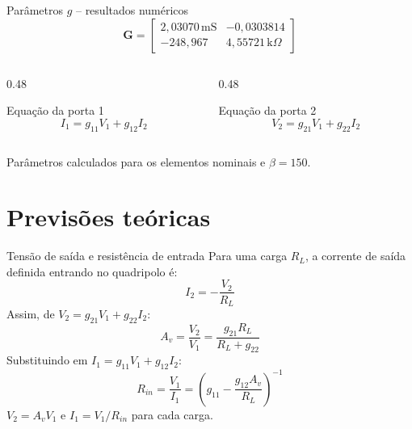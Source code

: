 \documentclass[aspectratio=169,11pt]{beamer}
\begin{document}
\begin{frame}{Parâmetros $g$ -- resultados numéricos}
  \[
  \boxed{\mathbf G=
  \begin{bmatrix}
  2{,}03070\,\mathrm{mS} & -0{,}0303814\\
  -248{,}967 & 4{,}55721\,\mathrm{k}\Omega
  \end{bmatrix}}
  \]
  \vspace{0.25cm}
  \begin{columns}[T,onlytextwidth]
  \begin{column}{0.48\textwidth}
  \begin{block}{Equação da porta 1}
  \small
  \[
  I_1=g_{11}V_1+g_{12}I_2
  \]
  \end{block}
  \end{column}
  \begin{column}{0.48\textwidth}
  \begin{block}{Equação da porta 2}
  \small
  \[
  V_2=g_{21}V_1+g_{22}I_2
  \]
  \end{block}
  \end{column}
  \end{columns}
  \vspace{0.3cm}
  \centering\scriptsize Parâmetros calculados para os elementos nominais e $\beta=150$.
\end{frame}


\section{Previsões teóricas}


\begin{frame}{Tensão de saída e resistência de entrada}
  \small
  Para uma carga $R_L$, a corrente de saída definida entrando no quadripolo é:
  \[
  I_2=-\frac{V_2}{R_L}
  \]
  Assim, de $V_2=g_{21}V_1+g_{22}I_2$:
  \[
  \boxed{A_v=\frac{V_2}{V_1}=\frac{g_{21}R_L}{R_L+g_{22}}}
  \]
  Substituindo em $I_1=g_{11}V_1+g_{12}I_2$:
  \[
  \boxed{R_{in}=\frac{V_1}{I_1}=\left(g_{11}-\frac{g_{12}A_v}{R_L}\right)^{-1}}
  \]
  \vspace{0.15cm}
  \centering\scriptsize $V_2=A_vV_1$ e $I_1=V_1/R_{in}$ para cada carga.
\end{frame}


\end{document}
